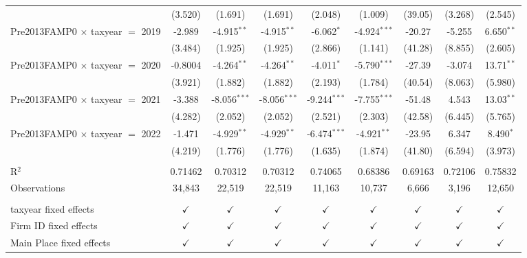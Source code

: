 \begin{tabular}{lcccccccc}
                                           & (3.520)       & (1.691)        & (1.691)        & (2.048)        & (1.009)        & (39.05)       & (3.268)        & (2.545)\\   
   Pre2013FAMP0 $\times$ taxyear $=$ 2019  & -2.989        & -4.915$^{**}$  & -4.915$^{**}$  & -6.062$^{*}$   & -4.924$^{***}$ & -20.27        & -5.255         & 6.650$^{**}$\\   
                                           & (3.484)       & (1.925)        & (1.925)        & (2.866)        & (1.141)        & (41.28)       & (8.855)        & (2.605)\\   
   Pre2013FAMP0 $\times$ taxyear $=$ 2020  & -0.8004       & -4.264$^{**}$  & -4.264$^{**}$  & -4.011$^{*}$   & -5.790$^{***}$ & -27.39        & -3.074         & 13.71$^{**}$\\   
                                           & (3.921)       & (1.882)        & (1.882)        & (2.193)        & (1.784)        & (40.54)       & (8.063)        & (5.980)\\   
   Pre2013FAMP0 $\times$ taxyear $=$ 2021  & -3.388        & -8.056$^{***}$ & -8.056$^{***}$ & -9.244$^{***}$ & -7.755$^{***}$ & -51.48        & 4.543          & 13.03$^{**}$\\   
                                           & (4.282)       & (2.052)        & (2.052)        & (2.521)        & (2.303)        & (42.58)       & (6.445)        & (5.765)\\   
   Pre2013FAMP0 $\times$ taxyear $=$ 2022  & -1.471        & -4.929$^{**}$  & -4.929$^{**}$  & -6.474$^{***}$ & -4.921$^{**}$  & -23.95        & 6.347          & 8.490$^{*}$\\   
                                           & (4.219)       & (1.776)        & (1.776)        & (1.635)        & (1.874)        & (41.80)       & (6.594)        & (3.973)\\   
    \\
   R$^2$                                   & 0.71462       & 0.70312        & 0.70312        & 0.74065        & 0.68386        & 0.69163       & 0.72106        & 0.75832\\  
   Observations                            & 34,843        & 22,519         & 22,519         & 11,163         & 10,737         & 6,666         & 3,196          & 12,650\\  
    \\
   taxyear fixed effects                   & $\checkmark$  & $\checkmark$   & $\checkmark$   & $\checkmark$   & $\checkmark$   & $\checkmark$  & $\checkmark$   & $\checkmark$\\   
   Firm ID fixed effects                   & $\checkmark$  & $\checkmark$   & $\checkmark$   & $\checkmark$   & $\checkmark$   & $\checkmark$  & $\checkmark$   & $\checkmark$\\   
   Main Place fixed effects                & $\checkmark$  & $\checkmark$   & $\checkmark$   & $\checkmark$   & $\checkmark$   & $\checkmark$  & $\checkmark$   & $\checkmark$\\   
   \bottomrule
\end{tabular}
\par\endgroup
